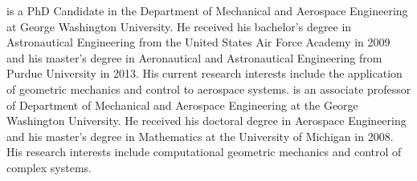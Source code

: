 \documentclass[10pt,fleqn]{IJCAS}  %
\begin{document}
\begin{multicols}{2}


    {is a PhD Candidate in the Department of Mechanical and Aerospace Engineering at George Washington University. 
    He received his bachelor's degree in Astronautical Engineering from the United States Air Force Academy in 2009 and his master's degree in Aeronautical and Astronautical Engineering from Purdue University in 2013.
    His current research interests include the application of geometric mechanics and control to aerospace systems. 
    }
    {is an associate professor of Department of Mechanical and Aerospace Engineering at the George Washington University. 
    He received his doctoral degree in Aerospace Engineering and his master's degree in Mathematics at the University of Michigan in 2008. 
    His research interests include computational geometric mechanics and control of complex systems.}    
\clearafterbiography\relax
\clearafterbiography\relax

\end{multicols}
\end{document}

